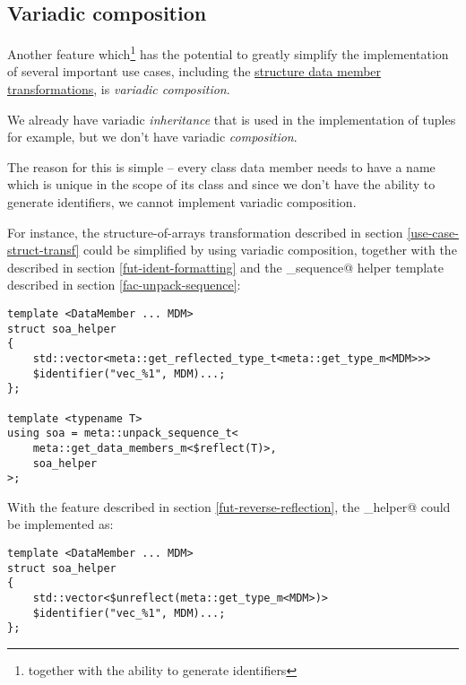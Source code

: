 \subsection{Variadic composition}
\label{fut-variadic-composition}

Another feature which\footnote{together with the ability to generate identifiers}
has the potential to greatly simplify the implementation of several important
use cases, including the \hyperref[use-case-struct-transf]{structure data
member transformations}, is {\em variadic composition}.

We already have variadic {\em inheritance} that is used in the implementation
of tuples for example, but we don't have variadic {\em composition}.

The reason for this is simple -- every class data member needs to have a name
which is unique in the scope of its class and since we don't have the ability
to generate identifiers, we cannot implement variadic composition.

For instance, the structure-of-arrays transformation described in section
\ref{use-case-struct-transf} could be simplified by using variadic composition,
together with the  described in section
\ref{fut-ident-formatting} and the \verb@unpack_sequence@ helper template
described in section \ref{fac-unpack-sequence}:

\begin{verbatim}
template <DataMember ... MDM>
struct soa_helper
{
	std::vector<meta::get_reflected_type_t<meta::get_type_m<MDM>>>
	$identifier("vec_%1", MDM)...;
};

template <typename T>
using soa = meta::unpack_sequence_t<
	meta::get_data_members_m<$reflect(T)>,
	soa_helper
>;
\end{verbatim}

With the  feature described in section
\ref{fut-reverse-reflection}, the \verb@soa_helper@ could be implemented as:

\begin{verbatim}
template <DataMember ... MDM>
struct soa_helper
{
	std::vector<$unreflect(meta::get_type_m<MDM>)>
	$identifier("vec_%1", MDM)...;
};
\end{verbatim}
